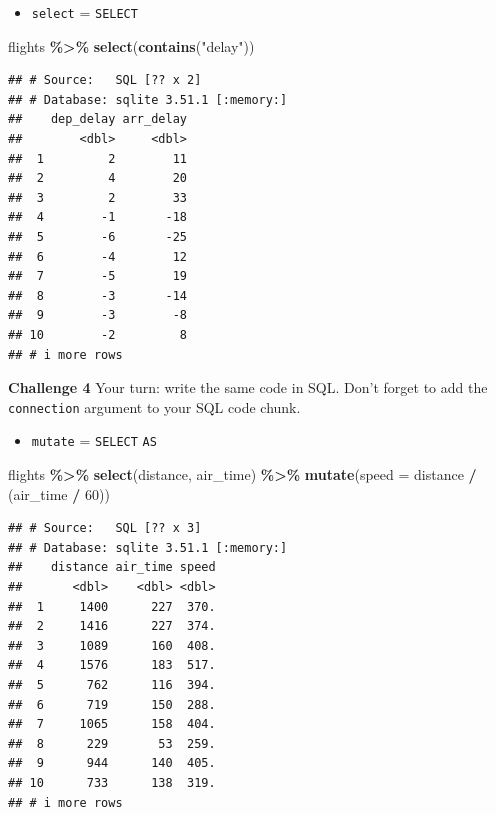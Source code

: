 \documentclass[
]{book}
\newenvironment{Shaded}{\begin{snugshade}}{\end{snugshade}}
\newcommand{\AttributeTok}[1]{\textcolor[rgb]{0.13,0.29,0.53}{#1}}
\newcommand{\DecValTok}[1]{\textcolor[rgb]{0.00,0.00,0.81}{#1}}
\newcommand{\FunctionTok}[1]{\textcolor[rgb]{0.13,0.29,0.53}{\textbf{#1}}}
\newcommand{\NormalTok}[1]{#1}
\newcommand{\SpecialCharTok}[1]{\textcolor[rgb]{0.81,0.36,0.00}{\textbf{#1}}}
\newcommand{\StringTok}[1]{\textcolor[rgb]{0.31,0.60,0.02}{#1}}
\providecommand{\tightlist}{%
  \setlength{\itemsep}{0pt}\setlength{\parskip}{0pt}}
\begin{document}
\begin{itemize}
\tightlist
\item
  \texttt{select} = \texttt{SELECT}
\end{itemize}

\begin{Shaded}
\begin{Highlighting}[]
\NormalTok{flights }\SpecialCharTok{\%\textgreater{}\%} 
  \FunctionTok{select}\NormalTok{(}\FunctionTok{contains}\NormalTok{(}\StringTok{"delay"}\NormalTok{))}
\end{Highlighting}
\end{Shaded}

\begin{verbatim}
## # Source:   SQL [?? x 2]
## # Database: sqlite 3.51.1 [:memory:]
##    dep_delay arr_delay
##        <dbl>     <dbl>
##  1         2        11
##  2         4        20
##  3         2        33
##  4        -1       -18
##  5        -6       -25
##  6        -4        12
##  7        -5        19
##  8        -3       -14
##  9        -3        -8
## 10        -2         8
## # i more rows
\end{verbatim}

\textbf{Challenge 4}
Your turn: write the same code in SQL. Don't forget to add the \texttt{connection} argument to your SQL code chunk.

\begin{itemize}
\tightlist
\item
  \texttt{mutate} = \texttt{SELECT} \texttt{AS}
\end{itemize}

\begin{Shaded}
\begin{Highlighting}[]
\NormalTok{flights }\SpecialCharTok{\%\textgreater{}\%}
  \FunctionTok{select}\NormalTok{(distance, air\_time) }\SpecialCharTok{\%\textgreater{}\%}  
  \FunctionTok{mutate}\NormalTok{(}\AttributeTok{speed =}\NormalTok{ distance }\SpecialCharTok{/}\NormalTok{ (air\_time }\SpecialCharTok{/} \DecValTok{60}\NormalTok{)) }
\end{Highlighting}
\end{Shaded}

\begin{verbatim}
## # Source:   SQL [?? x 3]
## # Database: sqlite 3.51.1 [:memory:]
##    distance air_time speed
##       <dbl>    <dbl> <dbl>
##  1     1400      227  370.
##  2     1416      227  374.
##  3     1089      160  408.
##  4     1576      183  517.
##  5      762      116  394.
##  6      719      150  288.
##  7     1065      158  404.
##  8      229       53  259.
##  9      944      140  405.
## 10      733      138  319.
## # i more rows
\end{verbatim}
\end{document}
